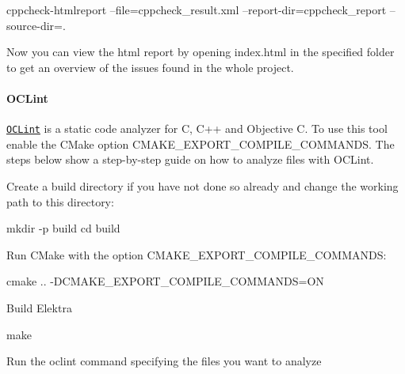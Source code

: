 \begin{DoxyCode}
cppcheck-htmlreport --file=cppcheck\_result.xml --report-dir=cppcheck\_report --source-dir=.
\end{DoxyCode}


Now you can view the html report by opening {\ttfamily index.\+html} in the specified folder to get an overview of the issues found in the whole project.

\paragraph*{O\+C\+Lint}

\href{http://oclint.org/}{\tt O\+C\+Lint} is a static code analyzer for C, C++ and Objective C. To use this tool enable the C\+Make option {\ttfamily C\+M\+A\+K\+E\+\_\+\+E\+X\+P\+O\+R\+T\+\_\+\+C\+O\+M\+P\+I\+L\+E\+\_\+\+C\+O\+M\+M\+A\+N\+DS}. The steps below show a step-\/by-\/step guide on how to analyze files with O\+C\+Lint.


\begin{DoxyEnumerate}
\item Create a build directory if you have not done so already and change the working path to this directory\+:
\end{DoxyEnumerate}


\begin{DoxyCode}
mkdir -p build
cd build
\end{DoxyCode}



\begin{DoxyEnumerate}
\item Run C\+Make with the option {\ttfamily C\+M\+A\+K\+E\+\_\+\+E\+X\+P\+O\+R\+T\+\_\+\+C\+O\+M\+P\+I\+L\+E\+\_\+\+C\+O\+M\+M\+A\+N\+DS}\+:
\end{DoxyEnumerate}


\begin{DoxyCode}
cmake .. -DCMAKE\_EXPORT\_COMPILE\_COMMANDS=ON
\end{DoxyCode}



\begin{DoxyEnumerate}
\item Build Elektra
\end{DoxyEnumerate}


\begin{DoxyCode}
make
\end{DoxyCode}



\begin{DoxyEnumerate}
\item Run the {\ttfamily oclint} command specifying the files you want to analyze
\end{DoxyEnumerate}


